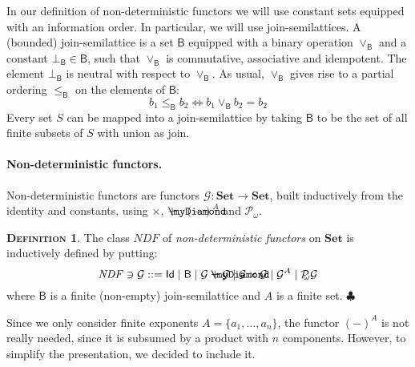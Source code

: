 \documentclass{LMCS}
\def\pow{{\mathcal P_{\!\!\!\omega}}}
\newcommand\ndf{\mathit{NDF}}
\newcommand\id{\mathsf{Id}}
\newcommand\B{\mathsf{B}}
\newcommand\G{\mathcal{G}}
\newcommand{\myplus}{\mathbin{\rlap{$\myDiamond$}\hspace*{.01cm}\raisebox{.14ex}{$+$}}}
\def\hyph{-\penalty0\hskip0pt\relax}
\theoremstyle{definition}
\newtheorem{mydefinition}{\textsc{Definition}}[section]
\theoremstyle{plain}
\theoremstyle{plain}
\theoremstyle{plain}
\theoremstyle{plain}
\theoremstyle{definition}
\theoremstyle{definition}
\newenvironment{definition}{
\begin{mydefinition}}
    {\hfill$\clubsuit$\end{mydefinition}}
\begin{document}
In our definition of non-deterministic functors we will use constant sets
equipped with an information order. In particular, we will use
join\hyph semilattices. A (bounded) join\hyph semilattice is a set $\B$ equipped
with a binary operation $\vee_\B$ and a constant $\bot_\B \in \B$, such
that $\vee_\B$ is commutative, associative and idempotent. The
element $\bot_\B$ is neutral with respect to $\vee_\B$. As usual, $\vee_\B$
gives rise to a partial ordering $\leq_\B$ on the elements of $\B$:
\[
b_1 \leq_\B b_2 \Leftrightarrow b_1\vee_\B b_2 = b_2
\]
Every set $S$
can be mapped into a join\hyph semilattice by taking $\B$ to be the
set of all finite subsets of $S$ with union as join.


\paragraph{\textbf{Non-deterministic functors.}} 
Non-deterministic functors 
are functors $\G\colon\textbf{Set} \to \textbf{Set}$, built inductively
from
the identity and constants, using $\times$, $\myplus$, $(-)^A$ and
$\pow$.
\begin{definition}\label{def:polfunctor}
The class $\ndf$ of {\em non\hyph deterministic functors}  on
$\mathbf{Set}$ is
inductively defined by putting:
\[
\ndf \ni \G ::= \id \mid \B \mid \G\myplus \G \mid \G\times
\G \mid \G^A \mid \pow \G
\]
where $\B$ is a finite (non-empty) join\hyph semilattice and $A$ is a finite set.
\end{definition}
Since we only consider finite exponents $A = \{a_1,\ldots,a_n\}$, the
functor $(-)^A$ is not really needed, since it is subsumed by a
product with $n$ components. However, to simplify the presentation, we
decided to
include it.
\end{document}
